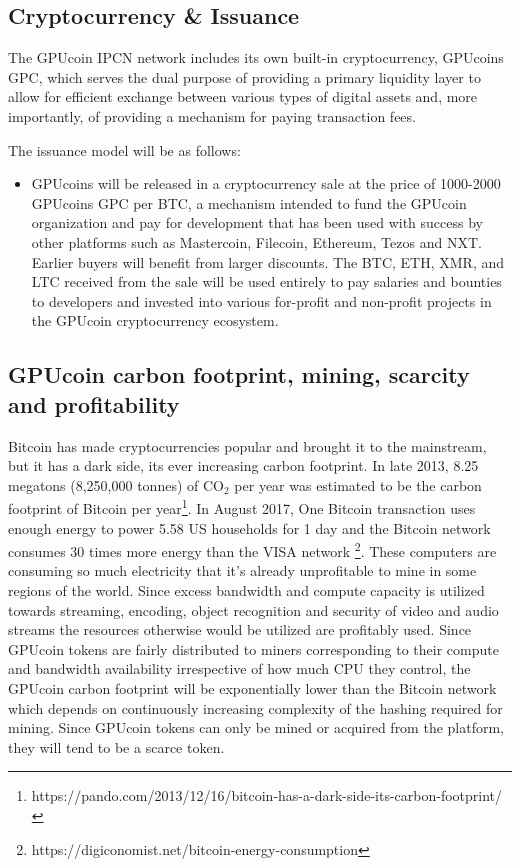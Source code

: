 \documentclass{article}
\begin{document}
\subsection{Cryptocurrency \& Issuance}

The GPUcoin IPCN network includes its own built-in cryptocurrency, GPUcoins GPC, which serves the dual purpose of providing a primary liquidity layer to allow for efficient exchange between various types of digital assets and, more importantly, of providing a mechanism for paying transaction fees.

The issuance model will be as follows:

\begin{itemize}

\item GPUcoins will be released in a cryptocurrency sale at the price of 1000-2000 GPUcoins GPC per BTC,
 a mechanism intended to fund the GPUcoin organization and pay for development that has been used with success by other platforms such as Mastercoin, Filecoin, Ethereum, Tezos and NXT.
Earlier buyers will benefit from larger discounts. The BTC, ETH, XMR, and LTC received from the sale will be used entirely to pay salaries and bounties to developers and invested into various for-profit and non-profit projects in the GPUcoin cryptocurrency ecosystem.

\end{itemize}

\subsection{GPUcoin carbon footprint, mining, scarcity and profitability}
Bitcoin has made cryptocurrencies popular and brought it to the mainstream, but it has a dark side, its ever increasing carbon footprint. In late 2013, 8.25 megatons (8,250,000 tonnes) of CO$_2$ per year was estimated to be the carbon footprint of Bitcoin per year\footnote{https://pando.com/2013/12/16/bitcoin-has-a-dark-side-its-carbon-footprint/}. In August 2017, One Bitcoin transaction uses enough energy to power 5.58 US households for 1 day and the Bitcoin network consumes 30 times more energy than the VISA network \footnote{https://digiconomist.net/bitcoin-energy-consumption}. These computers are consuming so much electricity that it’s already unprofitable to mine in some regions of the world. Since excess bandwidth and compute capacity is utilized towards streaming, encoding, object recognition and security of video and audio streams the resources otherwise would be utilized are profitably used. Since GPUcoin tokens are fairly distributed to miners corresponding to their compute and bandwidth availability irrespective of how much CPU they control, the GPUcoin carbon footprint will be exponentially lower than the Bitcoin network which depends on continuously increasing complexity of the hashing required for mining. Since GPUcoin tokens can only be mined or acquired from the platform, they will tend to be a scarce token.
\end{document}
